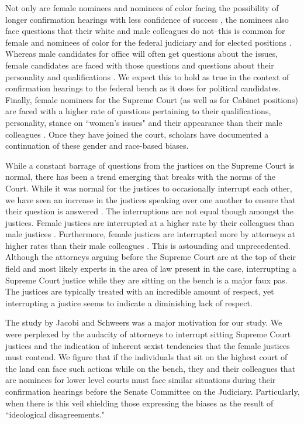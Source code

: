 \documentclass [12pt]{article}
\begin{document}
Not only are female nominees and nominees of color facing the possibility of longer confirmation hearings with less confidence of success \citep{asmussen_2011}, the nominees also face questions that their white and male colleagues do not--this is common for female and nominees of color for the federal judiciary and for elected positions \citep{boyd_2018, hayes_2015, devitt_2002, palmer_2010, schultz_1997}. Whereas male candidates for office will often get questions about the issues, female candidates are faced with those questions and questions about their personality and qualifications \citep{devitt_2002}. We expect this to hold as true in the context of confirmation hearings to the federal bench as it does for political candidates. Finally, female nominees for the Supreme Court (as well as for Cabinet positions) are faced with a higher rate of questions pertaining to their qualifications, personality, stance on ``women's issues" and their appearance than their male colleagues \citep{boyd_2018, hayes_2015, devitt_2002, palmer_2010, schultz_1997}. Once they have joined the court, scholars have documented a continuation of these gender and race-based biases.

While a constant barrage of questions from the justices on the Supreme Court is normal, there has been a trend emerging that breaks with the norms of the Court. While it was normal for the justices to occasionally interrupt each other, we have seen an increase in the justices speaking over one another to ensure that their question is answered \citep{jacobi_2017}. The interruptions are not equal though amongst the justices. Female justices are interrupted at a higher rate by their colleagues than male justices \citep{jacobi_2017}. Furthermore, female justices are interrupted more by attorneys at higher rates than their male colleagues \citep{jacobi_2017}. This is astounding and unprecedented. Although the attorneys arguing before the Supreme Court are at the top of their field and most likely experts in the area of law present in the case, interrupting a Supreme Court justice while they are sitting on the bench is a major faux pas. The justices are typically treated with an incredible amount of respect, yet interrupting a justice seems to indicate a diminishing lack of respect. 

The study by Jacobi and Schweers \citeyearpar{jacobi_2017} was a major motivation for our study. We were perplexed by the audacity of attorneys to interrupt sitting Supreme Court justices and the indication of inherent sexist tendencies that the female justices must contend. We figure that if the individuals that sit on the highest court of the land can face such actions while on the bench, they and their colleagues that are nominees for lower level courts must face similar situations during their confirmation hearings before the Senate Committee on the Judiciary. Particularly, when there is this veil shielding those expressing the biases as the result of ``ideological disagreements."
\end{document}
